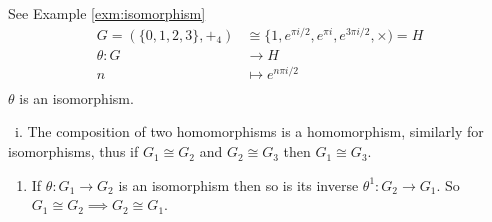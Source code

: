 See Example \ref{exm:isomorphism}
\begin{align*}
    G = (\{ 0, 1, 2, 3 \}, +_4) &\cong \{1, e^{\pi i/2}, e^{\pi i}, e^{3\pi i/2}, \times) = H \\
    \theta: G &\to H \\
    n &\mapsto e^{n \pi i /2} \\
\end{align*}
\(\theta\) is an isomorphism.

\begin{lemma}

~i. The composition of two homomorphisms is a homomorphism, similarly for isomorphisms, thus if \(G_1 \cong G_2\) and \(G_2 \cong G_3\) then \(G_1 \cong G_3\).

\begin{enumerate}
\def\labelenumi{\roman{enumi}.}
\setcounter{enumi}{1}
\tightlist
\item
  If \(\theta : G_1 \to G_2\) is an isomorphism then so is its inverse \(\theta^{1} : G_2 \to G_1\).
  So \(G_1 \cong G_2 \implies G_2 \cong G_1\).
\end{enumerate}

\end{lemma}

